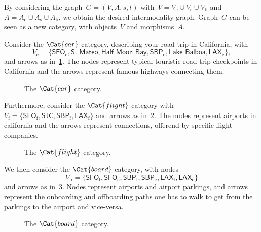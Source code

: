 By considering the graph~$G=(V,A,s,t)$ with~$V=V_\mathrm{c}\cup V_\mathrm{s}\cup V_\mathrm{b}$ and~$A=A_\mathrm{c}\cup A_\mathrm{s}\cup A_\mathrm{b}$, we obtain the desired intermodality graph. Graph~$G$ can be seen as a new category, with objects~$V$ and morphisms~$A$.
\begin{example}
  Consider the $\Cat{car}$ category, describing your road trip in California, with
  \begin{equation*}
    V_\mathrm{c}=\{\textsf{SFO}_\mathrm{c},\textsf{S. Mateo},\textsf{Half Moon Bay},\textsf{SBP}_\mathrm{c},\textsf{Lake Balboa},\textsf{LAX}_\mathrm{c}\},
  \end{equation*}
  and arrows as in~\cref{fig:carcat}. The nodes represent typical touristic road-trip checkpoints in California and the arrows represent famous highways connecting them.

  \begin{figure}[h!]
    \begin{center}
    \end{center}
    \caption{The $\Cat{car}$ category. \label{fig:carcat}}
  \end{figure}

  Furthermore, consider the $\Cat{flight}$ category with $V_\mathrm{f}=\{\textsf{SFO}_\mathrm{f}, \textsf{SJC}, \textsf{SBP}_\mathrm{f}, \textsf{LAX}_\mathrm{f}\}$ and arrows as in~\cref{fig:flight}. The nodes represent airports in california and the arrows represent connections, offerend by specific flight companies.

  \begin{figure}[h!]
    \begin{center}
    \end{center}
    \caption{The $\Cat{flight}$ category. \label{fig:flight}}
  \end{figure}

  We then consider the $\Cat{board}$ category, with nodes
  \begin{equation*}
    V_\mathrm{b}=\{\textsf{SFO}_\mathrm{f},\textsf{SFO}_\mathrm{c},\textsf{SBP}_\mathrm{f},\textsf{SBP}_\mathrm{c},\textsf{LAX}_\mathrm{f},\textsf{LAX}_\mathrm{c}\}
  \end{equation*}
  and arrows as in~\cref{fig:boarding}. Nodes represent airports and airport parkings, and arrows represent the onboarding and offboarding paths one has to walk to get from the parkings to the airport and vice-versa.

  \begin{figure}[h!]
    \begin{center}
    \end{center}
    \caption{The $\Cat{board}$ category. \label{fig:boarding}}
  \end{figure}


\end{example}
